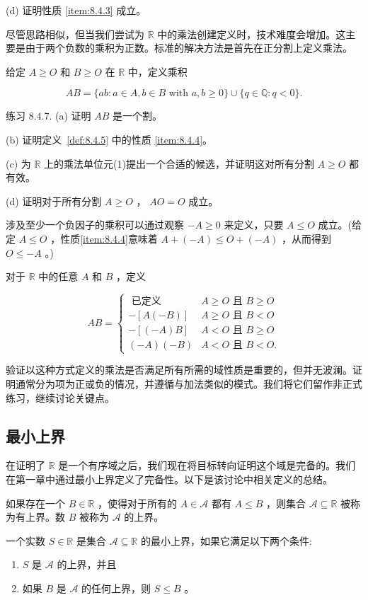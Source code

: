 (d) 证明性质 \ref{item:8.4.3} 成立。

尽管思路相似，但当我们尝试为 \(\mathbb{R}\) 中的乘法创建定义时，技术难度会增加。这主要是由于两个负数的乘积为正数。标准的解决方法是首先在正分割上定义乘法。

给定 \(A \geq  O\) 和 \(B \geq  O\) 在 \(\mathbb{R}\) 中，定义乘积

\[
{AB} = \{ {ab} : a \in  A,b \in  B\text{ with }a,b \geq  0\}  \cup  \{ q \in  \mathbb{Q} : q < 0\} .
\]

练习 8.4.7. (a) 证明 \({AB}\) 是一个割。

(b) 证明定义~\ref{def:8.4.5} 中的性质 \ref{item:8.4.4}。

(c) 为 \(\mathbb{R}\) 上的乘法单位元(1)提出一个合适的候选，并证明这对所有分割 \(A \geq  O\) 都有效。

(d) 证明对于所有分割 \(A \geq  O\) ， \({AO} = O\) 成立。

涉及至少一个负因子的乘积可以通过观察 \(- A \geq  0\) 来定义，只要 \(A \leq  O\) 成立。(给定 \(A \leq  O\) ，性质\ref{item:8.4.4}意味着 \(A + \left( {-A}\right)  \leq  O + \left( {-A}\right)\) ，从而得到 \(O \leq   - A\) 。)

对于 \(\mathbb{R}\) 中的任意 \(A\) 和 \(B\) ，定义

\[
{AB} = \left\{  \begin{array}{ll} \text{ 已定义} & A \geq  O\text{ 且 }B \geq  O \\   - \left\lbrack  {A\left( {-B}\right) }\right\rbrack  & A \geq  O\text{ 且 }B < O \\   - \left\lbrack  {\left( {-A}\right) B}\right\rbrack  & A < O\text{ 且 }B \geq  O \\  \left( {-A}\right) \left( {-B}\right) & A < O\text{ 且 }B < O. \end{array}\right.
\]

验证以这种方式定义的乘法是否满足所有所需的域性质是重要的，但并无波澜。证明通常分为项为正或负的情况，并遵循与加法类似的模式。我们将它们留作非正式练习，继续讨论关键点。

\subsection{最小上界}

在证明了 \(\mathbb{R}\) 是一个有序域之后，我们现在将目标转向证明这个域是完备的。我们在第一章中通过最小上界定义了完备性。以下是该讨论中相关定义的总结。

\begin{Def}
  \label{def:8.4.6}
  如果存在一个 \(B \in  \mathbb{R}\) ，使得对于所有的 \(A \in  \mathcal{A}\) 都有 \(A \leq  B\) ，则集合 \(\mathcal{A} \subseteq  \mathbb{R}\) 被称为有上界。数 \(B\) 被称为 \(\mathcal{A}\) 的上界。

一个实数 \(S \in  \mathbb{R}\) 是集合 \(\mathcal{A} \subseteq  \mathbb{R}\) 的最小上界，如果它满足以下两个条件:
\begin{enumerate}[label = (\roman*)]
\item  \(S\) 是 \(\mathcal{A}\) 的上界，并且
\item  如果 \(B\) 是 \(\mathcal{A}\) 的任何上界，则 \(S \leq  B\) 。
\end{enumerate}
\end{Def}


